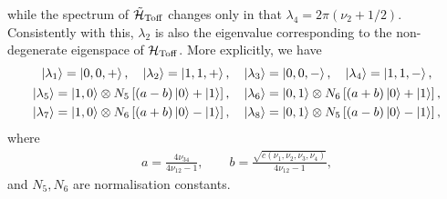 while the spectrum of $\tilde{{\mathcal{H}}}_{\operatorname{Toff}}$ changes only in that
$\lambda_4 = 2\pi(\nu_2 + 1/2)$.
Consistently with this, $\lambda_2$ is also the eigenvalue corresponding to the non-degenerate eigenspace of ${\mathcal{H}}_{\operatorname{Toff}}$.
More explicitly, we have
\begin{equation}
\begin{gathered}
    \ket{\lambda_1} = \ket{0, 0, +}, \quad
    \ket{\lambda_2} = \ket{1, 1, +}, \quad
    \ket{\lambda_3} = \ket{0, 0, -}, \quad
    \ket{\lambda_4} = \ket{1, 1, -}, \\
    \begin{aligned}
    \ket{\lambda_5} &= \ket{1, 0} \otimes N_5\left[(a - b) \ket0 + \ket1 \right], \quad
    \ket{\lambda_6} = \ket{0, 1} \otimes N_6\left[(a + b) \ket0 + \ket1 \right], \\
    \ket{\lambda_7} &= \ket{1, 0} \otimes N_6\left[(a + b) \ket0 - \ket1 \right], \quad
    \ket{\lambda_8} = \ket{0, 1} \otimes N_5\left[(a - b) \ket0 - \ket1 \right],
    \end{aligned}
\end{gathered}
\label{eq:GL:toffoli_eigenvectors_solution}
\end{equation}
where
\begin{equation}
\begin{gathered}
	a = \frac{4\nu_{34}}{4\nu_{12}-1},
	\qquad
	b = \frac{\sqrt{c(\nu_1,\nu_2,\nu_3,\nu_4)}}{4\nu_{12}-1},
\end{gathered}
\end{equation}
and $N_5,N_6$ are normalisation constants.
